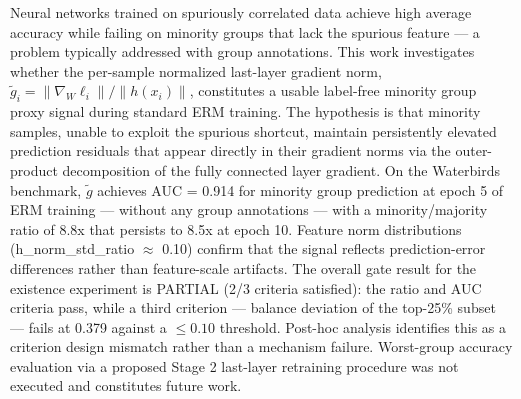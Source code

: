 
Neural networks trained on spuriously correlated data achieve high average accuracy while failing on minority groups that lack the spurious feature --- a problem typically addressed with group annotations. This work investigates whether the per-sample normalized last-layer gradient norm, $\tilde{g}_i = \|\nabla _W \ell _{i}\| / \|h(x_{i})\|$, constitutes a usable label-free minority group proxy signal during standard ERM training. The hypothesis is that minority samples, unable to exploit the spurious shortcut, maintain persistently elevated prediction residuals that appear directly in their gradient norms via the outer-product decomposition of the fully connected layer gradient. On the Waterbirds benchmark, $\tilde{g}$ achieves AUC = 0.914 for minority group prediction at epoch 5 of ERM training --- without any group annotations --- with a minority/majority ratio of 8.8x that persists to 8.5x at epoch 10. Feature norm distributions (h\_norm\_std\_ratio $\approx$ 0.10) confirm that the signal reflects prediction-error differences rather than feature-scale artifacts. The overall gate result for the existence experiment is PARTIAL (2/3 criteria satisfied): the ratio and AUC criteria pass, while a third criterion --- balance deviation of the top-25\% subset --- fails at 0.379 against a $\leq 0.10$ threshold. Post-hoc analysis identifies this as a criterion design mismatch rather than a mechanism failure. Worst-group accuracy evaluation via a proposed Stage 2 last-layer retraining procedure was not executed and constitutes future work.

